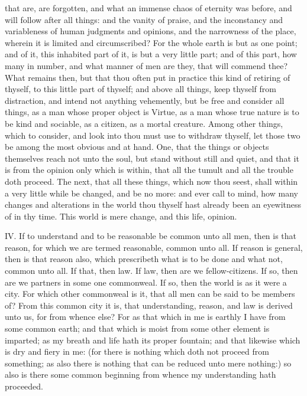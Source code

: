 that are, are forgotten, and what an immense chaos of eternity was before,
and will follow after all things: and the vanity of praise, and the
inconstancy and variableness of human judgments and opinions, and the
narrowness of the place, wherein it is limited and circumscribed? For the
whole earth is but as one point; and of it, this inhabited part of it, is
but a very little part; and of this part, how many in number, and what
manner of men are they, that will commend thee? What remains then, but
that thou often put in practice this kind of retiring of thyself, to this
little part of thyself; and above all things, keep thyself from
distraction, and intend not anything vehemently, but be free and consider
all things, as a man whose proper object is Virtue, as a man whose true
nature is to be kind and sociable, as a citizen, as a mortal creature.
Among other things, which to consider, and look into thou must use to
withdraw thyself, let those two be among the most obvious and at hand.
One, that the things or objects themselves reach not unto the soul, but
stand without still and quiet, and that it is from the opinion only which
is within, that all the tumult and all the trouble doth proceed. The next,
that all these things, which now thou seest, shall within a very little
while be changed, and be no more: and ever call to mind, how many changes
and alterations in the world thou thyself hast already been an eyewitness
of in thy time. This world is mere change, and this life, opinion.

IV. If to understand and to be reasonable be common unto all men, then
is that reason, for which we are termed reasonable, common unto all. If
reason is general, then is that reason also, which prescribeth what is to
be done and what not, common unto all. If that, then law. If law, then are
we fellow-citizens. If so, then are we partners in some one commonweal. If
so, then the world is as it were a city. For which other commonweal is it,
that all men can be said to be members of? From this common city it is,
that understanding, reason, and law is derived unto us, for from whence
else? For as that which in me is earthly I have from some common earth;
and that which is moist from some other element is imparted; as my breath
and life hath its proper fountain; and that likewise which is dry and
fiery in me: (for there is nothing which doth not proceed from something;
as also there is nothing that can be reduced unto mere nothing:) so also
is there some common beginning from whence my understanding hath
proceeded.

